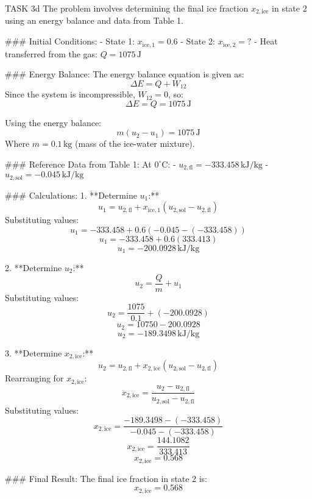 TASK 3d  
The problem involves determining the final ice fraction \( x_{2,\text{ice}} \) in state 2 using an energy balance and data from Table 1.

### Initial Conditions:
- State 1: \( x_{\text{ice},1} = 0.6 \)
- State 2: \( x_{\text{ice},2} = ? \)
- Heat transferred from the gas: \( Q = 1075 \, \text{J} \)

### Energy Balance:
The energy balance equation is given as:  
\[
\Delta E = Q + W_{12}
\]  
Since the system is incompressible, \( W_{12} = 0 \), so:  
\[
\Delta E = Q = 1075 \, \text{J}
\]  

Using the energy balance:  
\[
m(u_2 - u_1) = 1075 \, \text{J}
\]  
Where \( m = 0.1 \, \text{kg} \) (mass of the ice-water mixture).  

### Reference Data from Table 1:
At \( 0^\circ\text{C} \):  
- \( u_{2,\text{fl}} = -333.458 \, \text{kJ/kg} \)  
- \( u_{2,\text{sol}} = -0.045 \, \text{kJ/kg} \)  

### Calculations:
1. **Determine \( u_1 \):**  
\[
u_1 = u_{2,\text{fl}} + x_{\text{ice},1} (u_{2,\text{sol}} - u_{2,\text{fl}})
\]  
Substituting values:  
\[
u_1 = -333.458 + 0.6 (-0.045 - (-333.458))
\]  
\[
u_1 = -333.458 + 0.6 (333.413)
\]  
\[
u_1 = -200.0928 \, \text{kJ/kg}
\]  

2. **Determine \( u_2 \):**  
\[
u_2 = \frac{Q}{m} + u_1
\]  
Substituting values:  
\[
u_2 = \frac{1075}{0.1} + (-200.0928)
\]  
\[
u_2 = 10750 - 200.0928
\]  
\[
u_2 = -189.3498 \, \text{kJ/kg}
\]  

3. **Determine \( x_{2,\text{ice}} \):**  
\[
u_2 = u_{2,\text{fl}} + x_{2,\text{ice}} (u_{2,\text{sol}} - u_{2,\text{fl}})
\]  
Rearranging for \( x_{2,\text{ice}} \):  
\[
x_{2,\text{ice}} = \frac{u_2 - u_{2,\text{fl}}}{u_{2,\text{sol}} - u_{2,\text{fl}}}
\]  
Substituting values:  
\[
x_{2,\text{ice}} = \frac{-189.3498 - (-333.458)}{-0.045 - (-333.458)}
\]  
\[
x_{2,\text{ice}} = \frac{144.1082}{333.413}
\]  
\[
x_{2,\text{ice}} = 0.568
\]  

### Final Result:
The final ice fraction in state 2 is:  
\[
x_{2,\text{ice}} = 0.568
\]